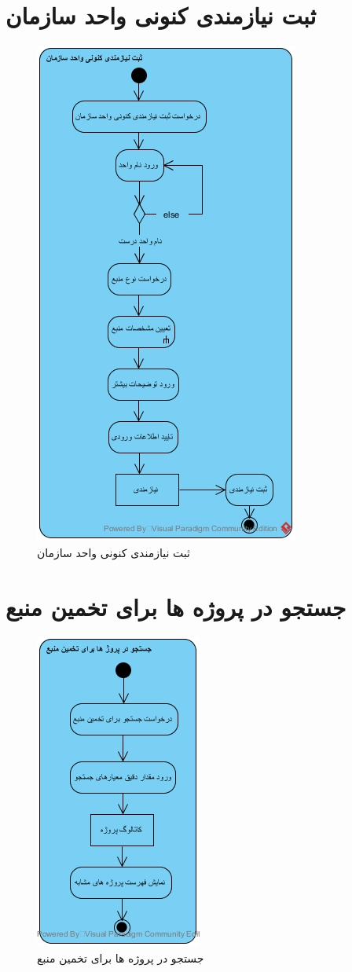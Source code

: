 \section{ثبت نیازمندی کنونی واحد سازمان}
\begin{figure}[H]
	\centering
	\includegraphics[scale=0.8]{img/activity/subreq}
	\caption{ثبت نیازمندی کنونی واحد سازمان}
\end{figure}

\section{جستجو در پروژه ها برای تخمین منبع}
\begin{figure}[H]
	\centering
	\includegraphics[scale=1]{img/activity/estres}
	\caption{جستجو در پروژه ها برای تخمین منبع}
\end{figure}

